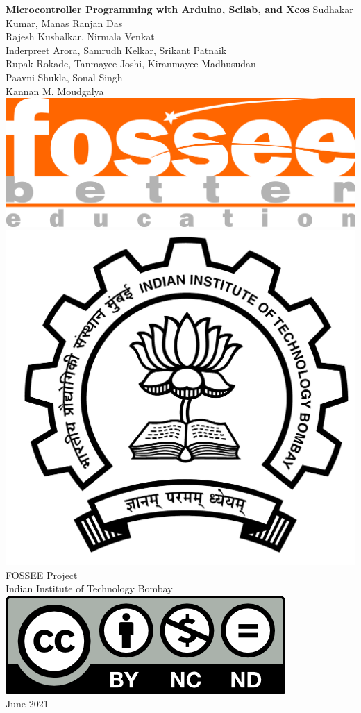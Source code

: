 \begin{center}
    {\bf {\Huge Microcontroller Programming with Arduino, Scilab, and Xcos}}
    \vfill
    Sudhakar Kumar, Manas Ranjan Das \\
    Rajesh Kushalkar, Nirmala Venkat \\
    Inderpreet Arora, Samrudh Kelkar, Srikant Patnaik \\
    Rupak Rokade, Tanmayee Joshi, Kiranmayee Madhusudan \\
    Paavni Shukla, Sonal Singh \\
    Kannan M. Moudgalya \\
    \vfill
    \includegraphics[width=0.3\linewidth]{suppl/fossee_logo_hi.png} \quad
    \includegraphics[width=0.2\linewidth]{suppl/IITB-logo-HighRes.png} \\
    FOSSEE Project \\
    Indian Institute of Technology Bombay \\ [2mm]
    \includegraphics[width=0.15\linewidth]{suppl/by-nc-nd.png} \\ [1mm]
    June 2021
\end{center}

\clearpage
